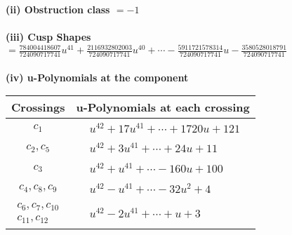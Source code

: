 \documentclass[1p]{elsarticle_modified}
\theoremstyle{definition}
\begin{document}
\flushleft \textbf{(ii) Obstruction class $= -1$}\\~\\
\flushleft \textbf{(iii) Cusp Shapes $= \frac{784004418607}{724090717741} u^{41}+\frac{2116932802003}{724090717741} u^{40}+\cdots-\frac{5911721578314}{724090717741} u-\frac{3580528018791}{724090717741}$}\\~\\
\newpage\renewcommand{\arraystretch}{1}
\flushleft \textbf{(iv) u-Polynomials at the component}\newline \\
\begin{tabular}{m{50pt}|m{274pt}}
Crossings & \hspace{64pt}u-Polynomials at each crossing \\
\hline $$\begin{aligned}c_{1}\end{aligned}$$&$\begin{aligned}
&u^{42}+17 u^{41}+\cdots+1720 u+121
\end{aligned}$\\
\hline $$\begin{aligned}c_{2},c_{5}\end{aligned}$$&$\begin{aligned}
&u^{42}+3 u^{41}+\cdots+24 u+11
\end{aligned}$\\
\hline $$\begin{aligned}c_{3}\end{aligned}$$&$\begin{aligned}
&u^{42}+u^{41}+\cdots-160 u+100
\end{aligned}$\\
\hline $$\begin{aligned}c_{4},c_{8},c_{9}\end{aligned}$$&$\begin{aligned}
&u^{42}- u^{41}+\cdots-32 u^2+4
\end{aligned}$\\
\hline $$\begin{aligned}c_{6},c_{7},c_{10}\\c_{11},c_{12}\end{aligned}$$&$\begin{aligned}
&u^{42}-2 u^{41}+\cdots+u+3
\end{aligned}$\\
\hline
\end{tabular}\\~\\
\end{document}
